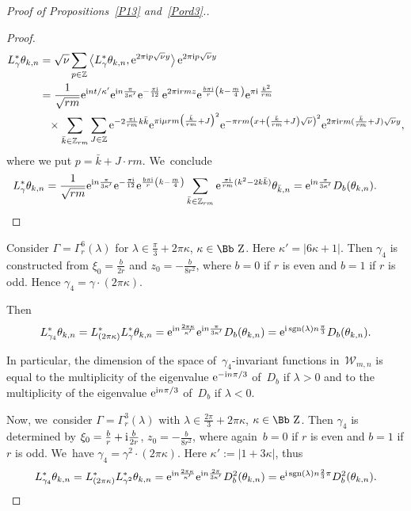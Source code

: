 \documentclass[pdftex]{sigma}
\newcommand\ZZ{{\mbox{\Bb Z}}}
\newcommand\Z{{\mathbb Z}}
\newcommand{\sgn}{\mathop{{\rm sgn}}}
\newcommand\la{\langle}
\newcommand\ra{\rangle}
\numberwithin{equation}{section}
\begin{document}
\begin{proof}[Proof of Propositions~\ref{P13} and~\ref{Pord3}.]
\begin{proof}
\begin{align*}
L^*_{\gamma} \theta_{k,n}&=\sqrt\nu \sum_{p\in\Z} \big\la L^*_{\gamma} \theta_{k,n}, {\rm e}^{2\pi {\rm i}p\sqrt\nu y}\big\ra \,{\rm e}^{2\pi {\rm i}p\sqrt\nu y}
\\
&=\frac1{\sqrt{rm}}{\rm e}^{{\rm i}nt/\kappa'}{\rm e}^{{\rm i}n\frac{\pi}{3\kappa'}}{\rm e}^{-\frac {\pi {\rm i}}{12}}\, {\rm e}^{2\pi {\rm i}rmz}{\rm e}^{\frac{b\pi {\rm i}}r\left(k-\frac m4\right)}{\rm e}^{\pi {\rm i}\,\frac{k^2}{rm}}
\\
&\phantom{=}\times \sum_{\bar k\in\Z_{rm}}\sum_{J\in\Z} {\rm e}^{-2\frac{\pi {\rm i}}{rm} k\bar k}{\rm e}^{\pi {\rm i}\mu rm\big(\frac{\bar k}{rm}+J\big)^2}{\rm e}^{-\pi rm\left(x+\left(\frac{\bar k}{rm}+J\right)\sqrt\nu\right)^2}{\rm e}^{2\pi {\rm i} rm (\frac{\bar k}{rm}+J) \sqrt\nu y},
\end{align*}
where we put $p=\bar k+J\cdot rm$. We~conclude
\begin{gather*}
L^*_{\gamma} \theta_{k,n} = \frac1{\sqrt{rm}}{\rm e}^{{\rm i}n\frac{\pi}{3\kappa'}}{\rm e}^{-\frac {\pi {\rm i}}{12}} {\rm e}^{\frac{b\pi {\rm i}}r\left(k-\frac m4\right)}
\sum_{\bar k\in \Z_{rm}} {\rm e}^{\frac{\pi {\rm i}}{rm} (k^2-2k\bar k)}\theta_{\bar k,n} = {\rm e}^{{\rm i}n\frac{\pi}{3\kappa'}} D_b(\theta_{k,n}). \tag*{\qed}
\end{gather*}
\renewcommand{\qed}{}
\end{proof}

Consider $\Gamma=\Gamma^6_r(\lambda)$ for $\lambda \in \frac\pi 3+2\pi\kappa$, $\kappa\in\ZZ$. Here $\kappa'=|6\kappa+1|$.
Then $\gamma_4$ is constructed from $\xi_0=\frac{b}{2r}$ and $z_0=-\frac{b}{8r^2}$, where $b=0$ if $r$ is even and $b=1$ if $r$ is odd. Hence $\gamma_4=\gamma\cdot(2\pi\kappa)$.

Then
\begin{gather*}
L^*_{\gamma_4} \theta_{k,n}=L^*_{(2\pi\kappa)} L^*_{\gamma}\theta_{k,n}={\rm e}^{{\rm i}n\frac{2\pi\kappa}{\kappa'}}{\rm e}^{{\rm i}n\frac{\pi}{3\kappa'}}D_b(\theta_{k,n})={\rm e}^{{\rm i}\sgn(\lambda)n\frac{\pi}{3}}D_b(\theta_{k,n}).
\end{gather*}

In particular, the dimension of the space of~$\gamma_4$-invariant functions in~${\mathcal W}_{m,n}$ is equal to the multiplicity of the eigenvalue ${\rm e}^{-{\rm i}n\pi/3}$ of~$D_b$ if $\lambda>0$ and to the multiplicity of the eigenvalue ${\rm e}^{{\rm i}n\pi/3}$ of~$D_b$ if $\lambda<0$.

Now, we~consider $\Gamma=\Gamma^3_r(\lambda)$ with $\lambda \in \frac{2\pi} 3+2\pi\kappa$, $\kappa\in\ZZ$. Then $\gamma_4$ is determined by $\xi_0=\frac{b}{r}+{\rm i}\frac{b}{2r}$, $z_0=-\frac{b}{8r^2}$, where again~$b=0$ if $r$ is even and $b=1$ if $r$ is odd. We~have $\gamma_4=\gamma^2\cdot(2\pi\kappa)$.
Here $\kappa':=|1+3\kappa|$, thus
\begin{gather*}
L^*_{\gamma_4} \theta_{k,n}=L^*_{(2\pi\kappa)} L^*_{\gamma^2}\theta_{k,n}={\rm e}^{{\rm i}n\frac{2\pi\kappa}{\kappa'}}{\rm e}^{{\rm i}n\frac{2\pi}{3\kappa'}}D_b^2(\theta_{k,n})={\rm e}^{{\rm i}\sgn(\lambda)n\frac{2}{3}\pi}D_b^2(\theta_{k,n}).
\end{gather*}


\end{proof}
\end{document}

